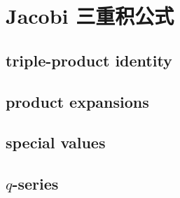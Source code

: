 \section{Jacobi 三重积公式}
\label{b3:sec:2402}


\subsection{triple-product identity}
\label{b3:subsec:240201}

\subsection{product expansions}
\label{b3:subsec:240202}

\subsection{special values}
\label{b3:subsec:240203}

\subsection{\texorpdfstring{\(q\)}{q}-series}
\label{b3:subsec:240204}


